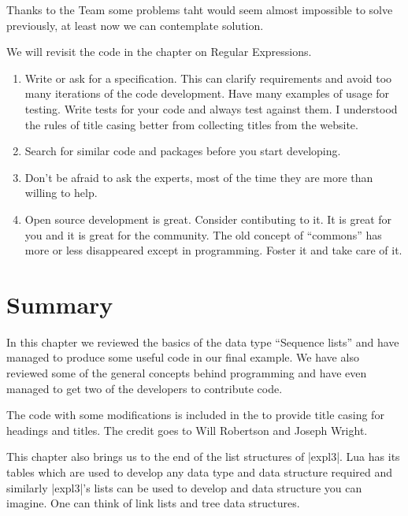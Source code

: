 Thanks to the  Team some problems taht would seem almost impossible to solve previously, at least now we can contemplate solution.

We will revisit the code in the chapter on Regular Expressions.

\begin{enumerate}
\item Write or ask for a specification. This can clarify requirements and avoid too many iterations of the code development. Have many examples of usage for testing.  Write tests for your code and always test against them. I understood the rules of title casing better from collecting titles from the \arxiv website.

\item Search for similar code and packages before you start developing.

\item Don't be afraid to ask the experts, most of the time they are more than willing to help.

\item Open source development is great. Consider contibuting to it. It is great for you and it is great for the community. The old concept of ``commons'' has more or less disappeared except in programming. Foster it and take care of it.
\end{enumerate}


\section{Summary}

In this chapter we reviewed the basics of the data type \enquote{Sequence lists} and have managed to produce some useful code in our final example. We have also reviewed some of the general concepts behind programming and have even managed to get two of the  developers to contribute code.

The code with some modifications is included in the  to provide title casing for headings and titles. The credit goes to Will Robertson and Joseph Wright. 

This chapter also brings us to the end of the list structures of |expl3|. Lua has its tables which are used to develop any data type and data structure required and similarly |expl3|'s lists can be used to develop and data structure you can imagine. One can think of link lists and tree data structures.

\endinput
A link list can easily be developed as it consists of elements that point to the next element only.  

